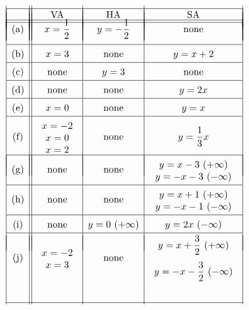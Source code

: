 \begin{Answer}\phantom{}\newline
    $\renewcommand{\arraystretch}{1.5} \begin{array}{|c||c|c|c|}
	&&&\vspace{-0.77cm}\\
	\hline
	&&&\vspace{-0.75cm}\\
	& \mbox{VA} & \mbox{HA} & \mbox{SA}\\
	&&&\vspace{-0.75cm} \\
	\hline
	\hline
	&&&\vspace{-0.75cm} \\
	\mbox{(a)} & x=\dfrac{1}{2} & y=-\dfrac{1}{2} & \mbox{none}\\[0.25cm]
	\hline
	\mbox{(b)} & x=3 & \mbox{none} & y=x+2\\
	\hline
	\mbox{(c)} & \mbox{none} & y=3 & \mbox{none}\\
	\hline
	\mbox{(d)} & \mbox{none} & \mbox{none} & y=2x\\
	\hline
	\mbox{(e)} & x=0 & \mbox{none} & y=x\\
	\hline
	\mbox{(f)} & \begin{array}{c} x=-2 \\[-0.2cm] x=0 \\[-0.2cm] x=2 \end{array} & \mbox{none} & y=\dfrac{1}{3} x\\
	&&&\vspace{-0.75cm} \\
	\hline
	\mbox{(g)} & \mbox{none} & \mbox{none} & \begin{array}{c} y=x-3\ (+\infty) \\[-0.2cm] y=-x-3\ (-\infty) \end{array} \\
	\hline
	\mbox{(h)} & \mbox{none} & \mbox{none} & \begin{array}{c} y=x+1\ (+\infty) \\[-0.2cm] y=-x-1\ (-\infty) \end{array} \\
	\hline
	\mbox{(i)} & \mbox{none} & y=0\ (+\infty) & y=2x\ (-\infty)  \\
	\hline
	&&&\vspace{-0.55cm} \\
	\mbox{(j)} & \begin{array}{c} x=-2 \\[-0.2cm] x=3 \end{array} & \mbox{none} & \begin{array}{c} y=x+\dfrac{3}{2}\ (+\infty) \\[0.3cm] y=-x-\dfrac{3}{2}\ (-\infty) \end{array}  \\[0.75cm]
	&&&\vspace{-0.07cm}\\
	\hline
	\end{array}$
\end{Answer}

